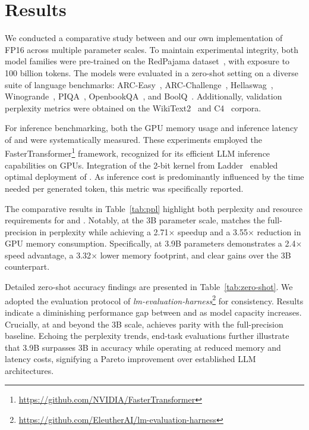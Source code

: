 \section{Results}

We conducted a comparative study between  and our own implementation of FP16  across multiple parameter scales. To maintain experimental integrity, both model families were pre-trained on the RedPajama dataset~\cite{redpajama}, with exposure to 100 billion tokens. The models were evaluated in a zero-shot setting on a diverse suite of language benchmarks: ARC-Easy~\cite{arc}, ARC-Challenge~\cite{arc}, Hellaswag~\cite{hellaswag}, Winogrande~\cite{winoGrande}, PIQA~\cite{piqa}, OpenbookQA~\cite{openbookqa}, and BoolQ~\cite{boolq}. Additionally, validation perplexity metrics were obtained on the WikiText2~\cite{wikitext2} and C4~\cite{c4} corpora.

For inference benchmarking, both the GPU memory usage and inference latency of  and  were systematically measured. These experiments employed the FasterTransformer\footnote{\url{https://github.com/NVIDIA/FasterTransformer}} framework, recognized for its efficient LLM inference capabilities on GPUs. Integration of the 2-bit kernel from Ladder~\cite{ladder} enabled optimal deployment of . As inference cost is predominantly influenced by the time needed per generated token, this metric was specifically reported.

The comparative results in Table~\ref{tab:ppl} highlight both perplexity and resource requirements for  and . Notably, at the 3B parameter scale,  matches the full-precision  in perplexity while achieving a 2.71$\times$ speedup and a 3.55$\times$ reduction in GPU memory consumption. Specifically,  at 3.9B parameters demonstrates a 2.4$\times$ speed advantage, a 3.32$\times$ lower memory footprint, and clear gains over the  3B counterpart.

Detailed zero-shot accuracy findings are presented in Table~\ref{tab:zero-shot}. We adopted the evaluation protocol of \emph{lm-evaluation-harness}\footnote{\url{https://github.com/EleutherAI/lm-evaluation-harness}} for consistency. Results indicate a diminishing performance gap between  and  as model capacity increases. Crucially, at and beyond the 3B scale,  achieves parity with the full-precision baseline. Echoing the perplexity trends, end-task evaluations further illustrate that  3.9B surpasses  3B in accuracy while operating at reduced memory and latency costs, signifying a Pareto improvement over established LLM architectures.

